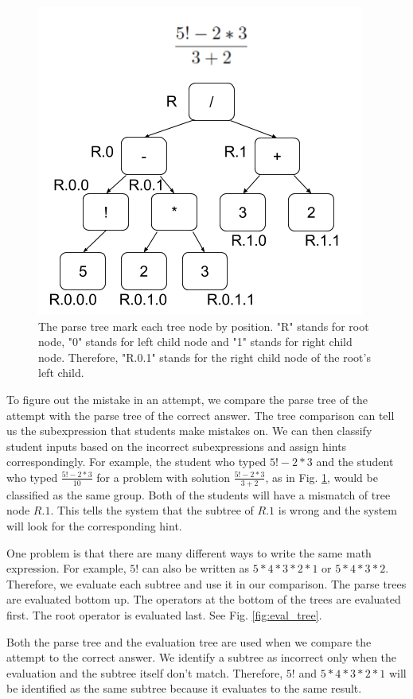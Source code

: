 \documentclass{article} %
\begin{document}
\begin{figure}[ht]
   \centering
   \includegraphics[width=.6\textwidth]{image/Parse_Trees.png}
   \caption{The parse tree mark each tree node by position. "R" stands for root node, "0" stands for left child node and "1" stands for right child node. Therefore, "R.0.1" stands for the right child node of the root's left child.}
   \label{fig:parse_tree}
\end{figure}

To figure out the mistake in an attempt, we compare the parse tree of the attempt with the parse tree of the correct answer. The tree comparison can tell us the subexpression that students make mistakes on. We can then classify student inputs based on the incorrect subexpressions and assign hints correspondingly. For example, the student who typed $5!-2*3$ and the student who typed $\frac{5!-2*3}{10}$ for a problem with solution $\frac{5!-2*3}{3+2}$, as in Fig. \ref{fig:parse_tree}, would be classified as the same group. Both of the students will have a mismatch of tree node $R.1$. This tells the system that the subtree of $R.1$ is wrong and the system will look for the corresponding hint.

One problem is that there are many different ways to write the same math expression. For example, $5!$ can also be written as $5*4*3*2*1$ or $5*4*3*2$. Therefore, we evaluate each subtree and use it in our comparison. The parse trees are evaluated bottom up. The operators at the bottom of the trees are evaluated first. The root operator is evaluated last. See Fig. \ref{fig:eval_tree}. 

Both the parse tree and the evaluation tree are used when we compare the attempt to the correct answer. We identify a subtree as incorrect only when the evaluation and the subtree itself don't match. Therefore, $5!$ and $5*4*3*2*1$ will be identified as the same subtree because it evaluates to the same result.
\end{document}
